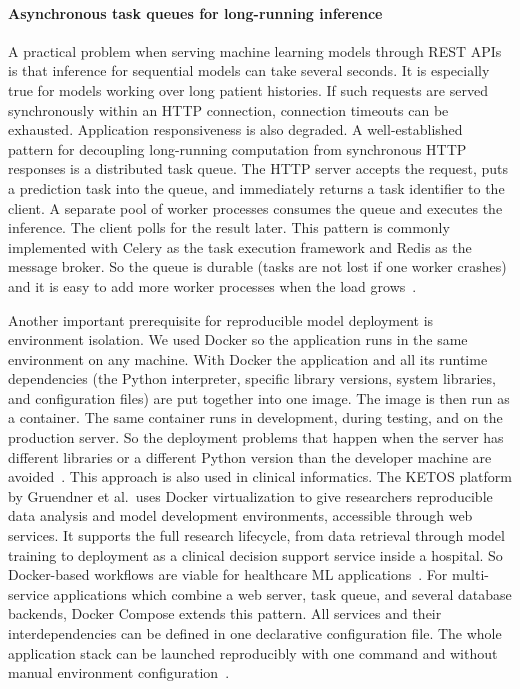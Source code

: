 \paragraph*{Asynchronous task queues for long-running inference}

A practical problem when serving machine learning models through REST APIs is that inference for sequential models can take several seconds. It is especially true for models working over long patient histories. If such requests are served synchronously within an HTTP connection, connection timeouts can be exhausted. Application responsiveness is also degraded. A well-established pattern for decoupling long-running computation from synchronous HTTP responses is a distributed task queue. The HTTP server accepts the request, puts a prediction task into the queue, and immediately returns a task identifier to the client. A separate pool of worker processes consumes the queue and executes the inference. The client polls for the result later. This pattern is commonly implemented with Celery as the task execution framework and Redis as the message broker. So the queue is durable (tasks are not lost if one worker crashes) and it is easy to add more worker processes when the load grows~\cite{maksimovic2024taskqueue}.

Another important prerequisite for reproducible model deployment is environment isolation. We used Docker so the application runs in the same environment on any machine. With Docker the application and all its runtime dependencies (the Python interpreter, specific library versions, system libraries, and configuration files) are put together into one image. The image is then run as a container. The same container runs in development, during testing, and on the production server. So the deployment problems that happen when the server has different libraries or a different Python version than the developer machine are avoided~\cite{rivera2018containers}. This approach is also used in clinical informatics. The KETOS platform by Gruendner et al.\ uses Docker virtualization to give researchers reproducible data analysis and model development environments, accessible through web services. It supports the full research lifecycle, from data retrieval through model training to deployment as a clinical decision support service inside a hospital. So Docker-based workflows are viable for healthcare ML applications~\cite{gruendner2019ketos}. For multi-service applications which combine a web server, task queue, and several database backends, Docker Compose extends this pattern. All services and their interdependencies can be defined in one declarative configuration file. The whole application stack can be launched reproducibly with one command and without manual environment configuration~\cite{list2018dockercompose}.


